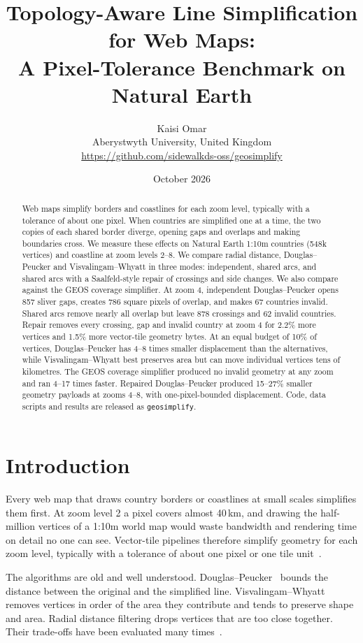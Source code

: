 \documentclass[11pt]{article}
\title{Topology-Aware Line Simplification for Web Maps:\\A Pixel-Tolerance Benchmark on Natural Earth}
\author{Kaisi Omar\\[2pt]
\small Aberystwyth University, United Kingdom\\
\small\url{https://github.com/sidewalkds-oss/geosimplify}}
\date{October 2026}
\begin{document}
\maketitle

\begin{abstract}
Web maps simplify borders and coastlines for each zoom level, typically with a
tolerance of about one pixel. When countries are simplified one at a time, the
two copies of each shared border diverge, opening gaps and overlaps and making
boundaries cross. We measure these effects on Natural Earth 1:10m countries
(548k vertices) and coastline at zoom levels 2--8. We compare radial distance,
Douglas--Peucker and Visvalingam--Whyatt in three modes: independent, shared
arcs, and shared arcs with a Saalfeld-style repair of crossings and side
changes. We also compare against the GEOS coverage simplifier. At zoom 4,
independent Douglas--Peucker opens 857 sliver gaps, creates 786 square pixels of
overlap, and makes 67 countries invalid. Shared arcs remove nearly all overlap
but leave 878 crossings and 62 invalid countries. Repair removes every crossing,
gap and invalid country at zoom 4 for 2.2\% more vertices and 1.5\% more
vector-tile geometry bytes. At an equal budget of 10\% of vertices, Douglas--Peucker has 4--8 times
smaller displacement than the alternatives, while Visvalingam--Whyatt best
preserves area but can move individual vertices tens of kilometres. The GEOS
coverage simplifier produced no invalid geometry at any zoom and ran 4--17 times
faster. Repaired Douglas--Peucker produced 15--27\% smaller geometry payloads at
zooms 4--8, with one-pixel-bounded displacement. Code, data scripts and results
are released as \texttt{geosimplify}.
\end{abstract}

\section{Introduction}

Every web map that draws country borders or coastlines at small scales
simplifies them first. At zoom level 2 a pixel covers almost 40\,km, and drawing
the half-million vertices of a 1:10m world map would waste bandwidth and
rendering time on detail no one can see. Vector-tile pipelines therefore
simplify geometry for each zoom level, typically with a tolerance of about one
pixel or one tile unit~\citep{tippecanoe,mvt21}.

The algorithms are old and well understood. Douglas--Peucker~\citep{ramer1972,douglas1973}
bounds the distance between the original and the simplified line.
Visvalingam--Whyatt~\citep{visvalingam1993} removes vertices in order of the
area they contribute and tends to preserve shape and area. Radial distance
filtering drops vertices that are too close together. Their trade-offs have
been evaluated many times~\citep{mcmaster1986,visvalingam1990,visvalingam1995,shi2006,song2016}.
\end{document}
